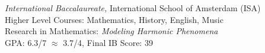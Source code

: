 {\sl International Baccalaureate,}
International School of Amsterdam (ISA)\\
Higher Level Courses: Mathematics, History, English, Music \\
Research in Mathematics: \textit{Modeling Harmonic Phenomena} \\
GPA: 6.3/7 $\approx$ 3.7/4, Final IB Score: 39
